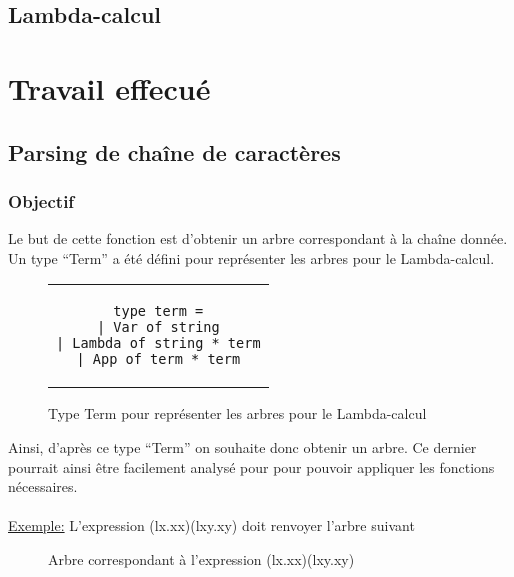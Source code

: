 \documentclass[a4paper,11pt,titlepage]{article}
\begin{document}
\subsection{Lambda-calcul}

\newpage
\section{Travail effecué}

\subsection{Parsing de chaîne de caractères}

\subsubsection{Objectif}
Le but de cette fonction est d'obtenir un arbre correspondant à la chaîne donnée.\\

Un type ``Term'' a été défini pour représenter les arbres pour le Lambda-calcul.
\begin{figure}[H]
\begin{center}
\begin{tabular}{c}

 \begin{lstlisting}
type term =
| Var of string
| Lambda of string * term
| App of term * term
 \end{lstlisting}

\end{tabular}
\end{center}
\caption{Type Term pour représenter les arbres pour le Lambda-calcul}
 \label{tree1}
\end{figure}
Ainsi, d'après ce type ``Term'' on souhaite donc obtenir un arbre. Ce dernier pourrait ainsi être facilement analysé pour pour pouvoir appliquer les fonctions nécessaires.
\\
\\\underline{Exemple:} L'expression (lx.xx)(lxy.xy) doit renvoyer l'arbre suivant

\begin{figure}[H]
\centering
  {
	 {{
		 {
			  {
			   {}
			   {}
			  }
		 }
	 }
	{
		 {
			  {
			   {{}
			   {}}
			  }
		 }
	}}
  }
\caption{Arbre correspondant à l'expression (lx.xx)(lxy.xy)}
 \label{tree1}
\end{figure}
\end{document}
